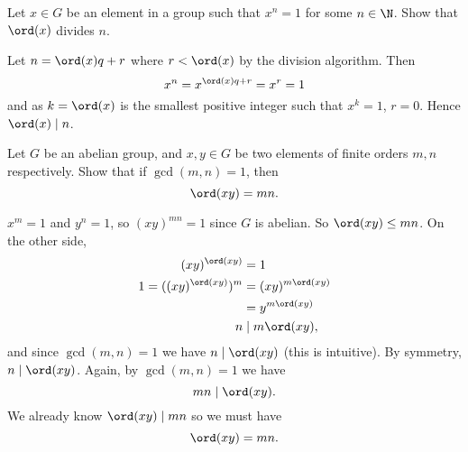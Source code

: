 
\question Let $x \in G$ be an element in a group such that $x^n = 1$ for some $n \in \N$.
Show that $\ord(x)$ divides $n$.
\begin{solution}
    Let $n = \ord(x)q + r$ where $r < \ord(x)$
    by the division algorithm.
    Then 
    \[
        x^n = x^{\ord(x)q + r} = x^r = 1
    \]
    and as $k = \ord(x)$ is the smallest positive integer such that $x^k = 1$, $r = 0$.
    Hence $\ord(x) \mid n$.
\end{solution}

\question Let $G$ be an abelian group, and $x,y \in G$ be two elements of finite orders $m,n$ respectively.
Show that if $\gcd(m,n)=1$, then
\[
    \ord(xy) = mn.
\]
\begin{solution}
    $x^m = 1$ and $y^n = 1$, so $(xy)^{mn} = 1$ since $G$ is abelian.
    So $\ord(xy) \leq mn$.
    On the other side,
    \begin{align*}
        (xy)^{\ord(xy)}         &= 1                \\
        1 = ((xy)^{\ord(xy)})^m &= (xy)^{m\ord(xy)} \\
                                &= y^{m\ord(xy)}    \\
        n                       &\mid m\ord(xy),
    \end{align*}
    and since $\gcd(m,n) = 1$ we have $n \mid \ord(xy)$ (this is intuitive).
    By symmetry, $n \mid \ord(xy)$.
    Again, by $\gcd(m,n) = 1$ we have
    \[
        mn \mid \ord(xy).
    \]
    We already know $\ord(xy) \mid mn$ so we must have
    \[
        \ord(xy) = mn.
    \]
\end{solution}

